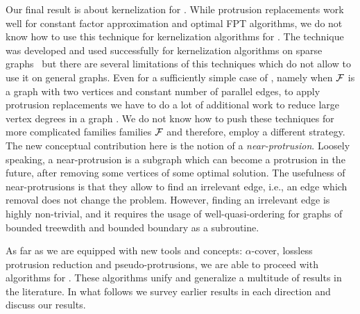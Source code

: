  
Our final result is about kernelization for \fd{}. 
While  protrusion replacements work well for constant factor approximation and optimal FPT algorithms, we do not know how to use this technique for kernelization algorithms for \fd. The technique was developed and used successfully  for kernelization algorithms 
  on  sparse graphs~\cite{BodlaenderFLPST09,FominLST10}
  but there are several limitations of this techniques which do not allow to use it on general graphs. Even for a sufficiently simple case of \fd, namely when $\cal{F}$ is a graph with two vertices and constant number of parallel edges, to apply protrusion replacements we have to do a lot of  additional work to reduce large vertex degrees in a graph  \cite{FominLMPS11}. We do not know how to push these techniques for more complicated families  families  $\cal{F}$ and therefore, employ a different strategy. 
   The new conceptual contribution here is the notion of a \emph{near-protrusion}. Loosely speaking, a near-protrusion is a subgraph which can become a protrusion in the future, after removing some vertices of some optimal solution. The usefulness of   near-protrusions is that they allow to find an irrelevant edge, i.e.,  an edge  which removal does not change the problem. However, finding an irrelevant edge is highly non-trivial, and it requires the usage of well-quasi-ordering  for 
   graphs of bounded treewdith  and bounded boundary as a subroutine.   



As far as we are equipped with new tools and concepts:   $\alpha$-cover, lossless protrusion reduction and pseudo-protrusions, we are able to 
proceed with algorithms for  \fd{}. These algorithms  unify and generalize a multitude of results in the literature. In what follows we survey 
earlier results in each direction and discuss our results.





\vspace{-.3cm}
